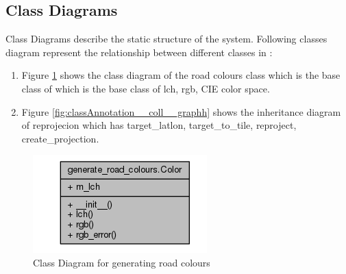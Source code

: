 \subsection{Class Diagrams}
Class Diagrams describe the static structure of the system. Following classes diagram represent the relationship between different classes in :
\begin{enumerate}
	\item Figure \ref{fig:collaborative1} shows the class diagram of the road colours class which is the base class of which is the base class of lch, rgb, CIE color space.

	\item Figure \ref{fig:classAnnotation__coll__graphh}  shows the inheritance diagram of reprojecion which has target\_latlon, target\_to\_tile, reproject, create\_projection.
\end{enumerate}

\begin{figure}
    \centering
    \includegraphics[scale=.85]{input/images/class_road.png}
    \caption{Class Diagram for generating road colours}
    \label{fig:collaborative1}
\end{figure}

\iffalse

